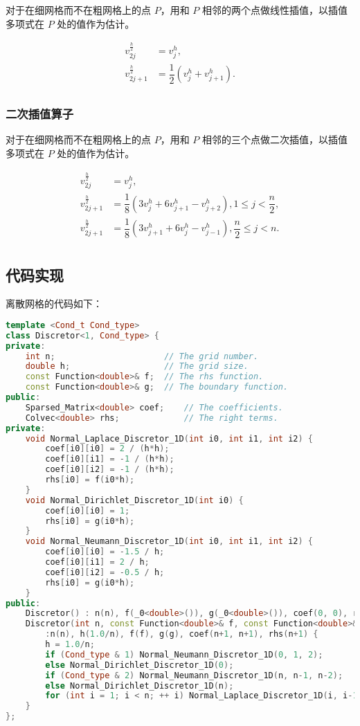 \documentclass{ctexart}
\begin{document}
对于在细网格而不在粗网格上的点 $P$，用和 $P$ 相邻的两个点做线性插值，以插值多项式在 $P$ 处的值作为估计。

\begin{equation}
\begin{split}
	v_{2j}^{\frac h2} &= v_j^h,\\
	v_{2j+1}^{\frac h2} &= \dfrac 12(v_j^h + v_{j+1}^h).\\
\end{split}
\end{equation}

\subsubsection{二次插值算子}

对于在细网格而不在粗网格上的点 $P$，用和 $P$ 相邻的三个点做二次插值，以插值多项式在 $P$ 处的值作为估计。

\begin{equation}
\begin{split}
	v_{2j}^{\frac h2} & = v_j^h,\\
	v_{2j+1}^{\frac h2} & = \dfrac 18(3v_{j}^{h} + 6v_{j+1}^{h} - v_{j+2}^{h}),1\leq j< \dfrac n2,\\
	v_{2j+1}^{\frac h2} & = \dfrac 18(3v_{j+1}^{h} + 6v_j^{h} - v_{j-1}^{h}),\dfrac n2\leq j< n.\\
\end{split}
\end{equation}

\subsection{代码实现}

离散网格的代码如下：

\begin{lstlisting}[language={c++}]
template <Cond_t Cond_type>
class Discretor<1, Cond_type> {
private:
	int n;						// The grid number.
	double h;					// The grid size.
	const Function<double>& f;	// The rhs function.
	const Function<double>& g;	// The boundary function.
public:
	Sparsed_Matrix<double> coef;	// The coefficients.
	Colvec<double> rhs;				// The right terms.
private:
	void Normal_Laplace_Discretor_1D(int i0, int i1, int i2) {
		coef[i0][i0] = 2 / (h*h);
		coef[i0][i1] = -1 / (h*h);
		coef[i0][i2] = -1 / (h*h);
		rhs[i0] = f(i0*h);
	}
	void Normal_Dirichlet_Discretor_1D(int i0) {
		coef[i0][i0] = 1;
		rhs[i0] = g(i0*h);
	}
	void Normal_Neumann_Discretor_1D(int i0, int i1, int i2) {
		coef[i0][i0] = -1.5 / h;
		coef[i0][i1] = 2 / h;
		coef[i0][i2] = -0.5 / h;
		rhs[i0] = g(i0*h);
	}
public:
	Discretor() : n(n), f(_0<double>()), g(_0<double>()), coef(0, 0), rhs(0) {}
	Discretor(int n, const Function<double>& f, const Function<double>& g)
		:n(n), h(1.0/n), f(f), g(g), coef(n+1, n+1), rhs(n+1) {
		h = 1.0/n;
		if (Cond_type & 1) Normal_Neumann_Discretor_1D(0, 1, 2);
		else Normal_Dirichlet_Discretor_1D(0);
		if (Cond_type & 2) Normal_Neumann_Discretor_1D(n, n-1, n-2);
		else Normal_Dirichlet_Discretor_1D(n);
		for (int i = 1; i < n; ++ i) Normal_Laplace_Discretor_1D(i, i-1, i+1);
	}
};
\end{lstlisting}
\end{document}
